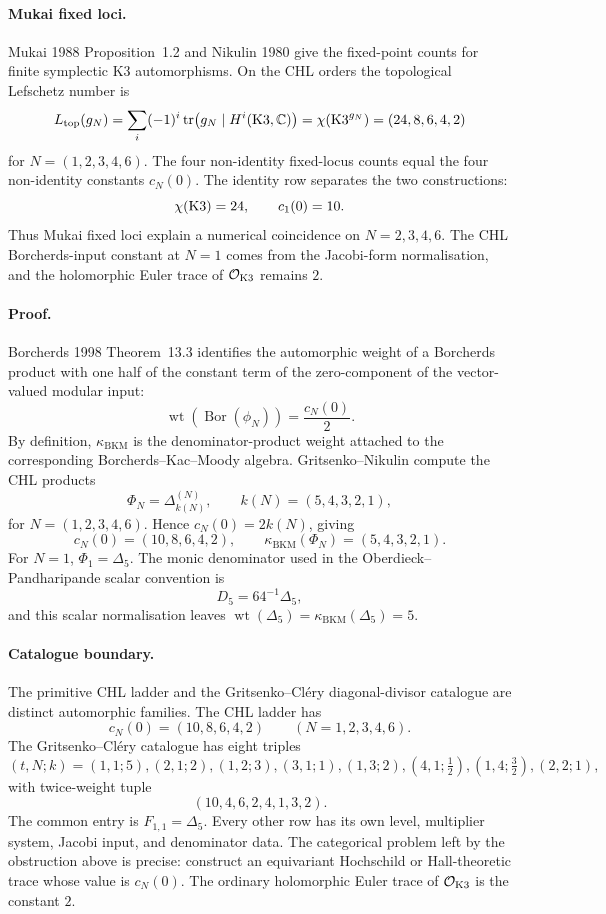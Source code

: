 \paragraph{Mukai fixed loci.}
Mukai 1988 Proposition~1.2 and Nikulin 1980 give the fixed-point counts
for finite symplectic K3 automorphisms. On the CHL orders the
topological Lefschetz number is
\[
  L_{\mathrm{top}}(g_N)
  =
  \sum_i(-1)^i\operatorname{tr}\!\left(g_N\mid H^i(\mathrm{K3},\mathbb C)\right)
  =
  \chi(\mathrm{K3}^{g_N})
  =
  (24,8,6,4,2)
\]
for \(N=(1,2,3,4,6)\). The four non-identity fixed-locus counts equal
the four non-identity constants \(c_N(0)\). The identity row separates
the two constructions:
\[
  \chi(\mathrm{K3})=24,\qquad c_1(0)=10.
\]
Thus Mukai fixed loci explain a numerical coincidence on
\(N=2,3,4,6\). The CHL Borcherds-input constant at \(N=1\) comes from
the Jacobi-form normalisation, and the holomorphic Euler trace of
\(\mathcal{O}_{\mathrm{K3}}\) remains \(2\).

\paragraph{Proof.}
Borcherds 1998 Theorem~13.3 identifies the automorphic weight of a
Borcherds product with one half of the constant term of the
zero-component of the vector-valued modular input:
\[
  \operatorname{wt}(\operatorname{Bor}(\phi_N))=\frac{c_N(0)}2.
\]
By definition, \(\kappa_{\mathrm{BKM}}\) is the denominator-product
weight attached to the corresponding Borcherds--Kac--Moody algebra.
Gritsenko--Nikulin compute the CHL products
\[
  \Phi_N=\Delta^{(N)}_{k(N)},\qquad
  k(N)=(5,4,3,2,1),
\]
for \(N=(1,2,3,4,6)\). Hence \(c_N(0)=2k(N)\), giving
\[
  c_N(0)=(10,8,6,4,2),\qquad
  \kappa_{\mathrm{BKM}}(\Phi_N)=(5,4,3,2,1).
\]
For \(N=1\), \(\Phi_1=\Delta_5\). The monic denominator used in the
Oberdieck--Pandharipande scalar convention is
\[
  D_5=64^{-1}\Delta_5,
\]
and this scalar normalisation leaves
\(\operatorname{wt}(\Delta_5)=\kappa_{\mathrm{BKM}}(\Delta_5)=5\).

\paragraph{Catalogue boundary.}
The primitive CHL ladder and the Gritsenko--Cl\'ery diagonal-divisor
catalogue are distinct automorphic families. The CHL ladder has
\[
  c_N(0)=(10,8,6,4,2)
  \qquad (N=1,2,3,4,6).
\]
The Gritsenko--Cl\'ery catalogue has eight triples
\[
  (t,N;k)=
  (1,1;5),(2,1;2),(1,2;3),(3,1;1),
  (1,3;2),(4,1;\tfrac12),(1,4;\tfrac32),(2,2;1),
\]
with twice-weight tuple
\[
  (10,4,6,2,4,1,3,2).
\]
The common entry is \(F_{1,1}=\Delta_5\). Every other row has its own
level, multiplier system, Jacobi input, and denominator data. The
categorical problem left by the obstruction above is precise:
construct an equivariant Hochschild or Hall-theoretic trace whose
value is \(c_N(0)\). The ordinary holomorphic Euler trace of
\(\mathcal{O}_{\mathrm{K3}}\) is the constant \(2\).

